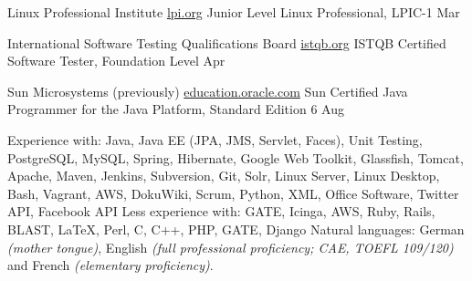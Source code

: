 \documentclass[10pt,a4paper]{article}
\begin{document}
\headedsection
  {Linux Professional Institute}
  {\href{https://www.lpi.org/linux-certifications/programs}{lpi.org}} {%
  \headedsubsection
    {Junior Level Linux Professional, LPIC-1}
    {Mar }
    {}
}

\headedsection
  {International Software Testing Qualifications Board}
  {\href{http://www.istqb.org/certification-path-root/foundation-level/foundation-level-content.html}{istqb.org}} {%
  \headedsubsection
    {ISTQB Certified Software Tester,  Foundation Level}
    {Apr }
    {}
}

\headedsection
  {Sun Microsystems (previously)}
  {\href{http://education.oracle.com/}{education.oracle.com}} {%
  \headedsubsection
    {Sun Certified Java Programmer for the Java Platform, Standard Edition 6}
    {Aug }
    {}
}

\spacedhrule{0.8em}{-0.4em}


\inlineheadsection  %
  {Experience with:}
  {Java, Java EE (JPA, JMS, Servlet, Faces), Unit Testing, PostgreSQL, MySQL, Spring, Hibernate, Google Web Toolkit, Glassfish, Tomcat, Apache, Maven, Jenkins, Subversion, Git, Solr, Linux Server, Linux Desktop, Bash, Vagrant, AWS, DokuWiki, Scrum, Python, XML, Office Software, Twitter API, Facebook API}
\vspace{0.5em}
\inlineheadsection
  {Less experience with:}
  {GATE, Icinga, AWS, Ruby, Rails, BLAST, LaTeX, Perl, C, C++, PHP, GATE, Django}
\vspace{0.5em}
\inlineheadsection
  {Natural languages:}
  {German \emph{(mother tongue)}, English \emph{(full professional proficiency; CAE, TOEFL 109/120)} and French \emph{(elementary proficiency)}.}

\spacedhrule{1.9em}{-0.4em}

\end{document}
